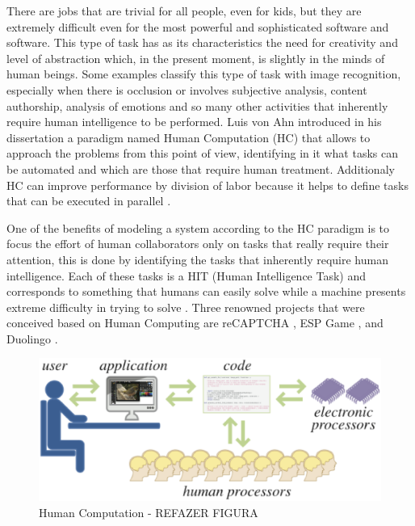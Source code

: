There are jobs that are trivial for all people, even for kids, but they are extremely difficult even for the most powerful and sophisticated software and software. This type of task has as its characteristics the need for creativity and level of abstraction which, in the present moment, is slightly in the minds of human beings. Some examples classify this type of task with image recognition, especially when there is occlusion or involves subjective analysis, content authorship, analysis of emotions and so many other activities that inherently require human intelligence to be performed. Luis von Ahn introduced in his dissertation  \cite{VonAhn:2005:HC:1168246}  a paradigm named Human Computation (HC) that allows to approach the problems from this point of view, identifying in it what tasks can be automated and which are those that require human treatment. Additionaly HC can improve performance by division of labor because it helps to define tasks that can be executed in parallel \cite{Rohwer:2010:NHC:1837885.1837897}.

One of the benefits of modeling a system according to the HC paradigm is to focus the effort of human collaborators only on tasks that really require their attention, this is done by identifying the tasks that inherently require human intelligence. Each of these tasks is a HIT (Human Intelligence Task) and corresponds to something that humans can easily solve while a machine presents extreme difficulty in trying to solve \cite{doi:10.2200/S00371ED1V01Y201107AIM013}. Three renowned projects that were conceived based on Human Computing are reCAPTCHA \cite{Simmons:2010:PLV:1869086.1869102}, ESP Game \cite{Robertson:2009:REG:1520340.1520597}, and Duolingo \cite{vonAhn:2011:THC}.

\begin{figure}[!htb]
\centering
\includegraphics[scale=0.2]{figure/hc}
\caption{Human Computation - REFAZER FIGURA}
\label{Human Computation}
\end{figure}

